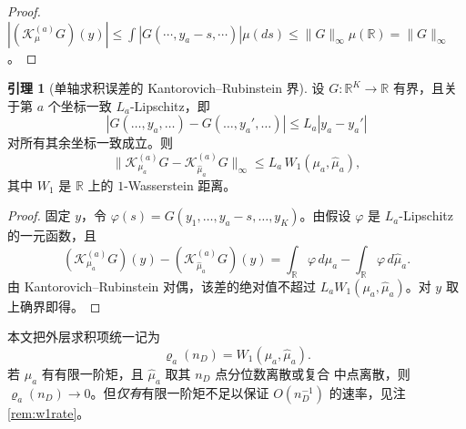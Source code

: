 \documentclass[a4paper,11pt]{article}
\theoremstyle{definition}
\newtheorem{lemma}{引理}
\newcommand{\R}{\mathbb R}
\newcommand{\1}{\mathbf 1}
\begin{document}
\begin{proof}
$|(\mathcal K_\mu^{(a)}G)(y)|\le\int|G(\cdots,y_a-s,\cdots)|\mu(ds)
\le\|G\|_\infty\mu(\R)=\|G\|_\infty$。
\end{proof}

\begin{lemma}[单轴求积误差的 Kantorovich--Rubinstein 界]
\label{lem:kr}
设 $G:\R^K\to\R$ 有界，且关于第 $a$ 个坐标一致 $L_a$-Lipschitz，即
\[
|G(\ldots,y_a,\ldots)-G(\ldots,y_a',\ldots)|\le L_a|y_a-y_a'|
\]
对所有其余坐标一致成立。则
\[
\bigl\|\mathcal K_{\mu_a}^{(a)}G-\mathcal K_{\widehat\mu_a}^{(a)}G\bigr\|_\infty
\le
L_a\,W_1(\mu_a,\widehat\mu_a),
\]
其中 $W_1$ 是 $\R$ 上的 $1$-Wasserstein 距离。
\end{lemma}

\begin{proof}
固定 $y$，令 $\varphi(s)=G(y_1,\ldots,y_a-s,\ldots,y_K)$。由假设 $\varphi$
是 $L_a$-Lipschitz 的一元函数，且
\[
(\mathcal K_{\mu_a}^{(a)}G)(y)-(\mathcal K_{\widehat\mu_a}^{(a)}G)(y)
=
\int_\R\varphi\,d\mu_a-\int_\R\varphi\,d\widehat\mu_a.
\]
由 Kantorovich--Rubinstein 对偶，该差的绝对值不超过
$L_a W_1(\mu_a,\widehat\mu_a)$。对 $y$ 取上确界即得。
\end{proof}

本文把外层求积项统一记为
\[
\varrho_a(n_D)=W_1(\mu_a,\widehat\mu_a).
\]
若 $\mu_a$ 有有限一阶矩，且 $\widehat\mu_a$ 取其 $n_D$ 点分位数离散或复合
中点离散，则 $\varrho_a(n_D)\to0$。但\emph{仅有}有限一阶矩不足以保证
$O(n_D^{-1})$ 的速率，见注 \ref{rem:w1rate}。
\end{document}
